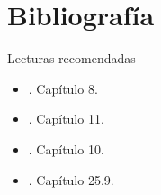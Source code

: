\documentclass[9pt, aspectratio=169]{beamer}
\begin{document}

\section*{Bibliografía}
\begin{frame}[allowframebreaks]{Lecturas recomendadas}
\begin{itemize}
    \item {}. Capítulo 8.
    \item {}. Capítulo 11.
    \item {}. Capítulo 10.
    \item {}. Capítulo 25.9.
\end{itemize}
\end{frame}
\end{document}
